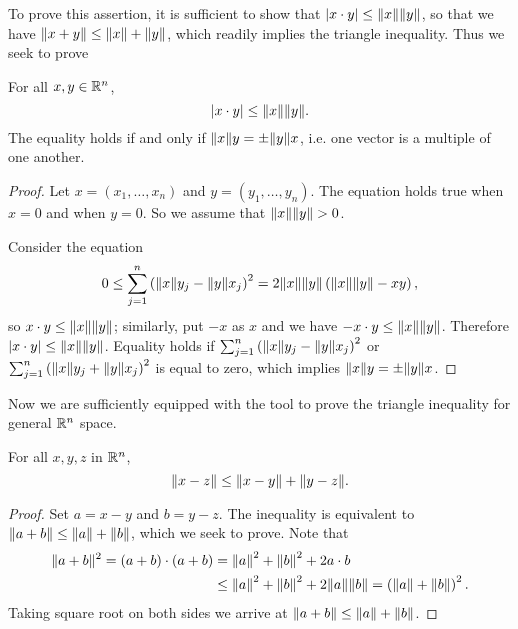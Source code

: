 \documentclass[main.tex]{subfiles}
\begin{document}
		To prove this assertion, it is sufficient to show that $\lvert x \cdot y\rvert \leq \lVert x\rVert \lVert y\rVert$, so that we have $\lVert x + y\rVert \leq \lVert x\rVert + \lVert y\rVert$, which readily implies the triangle inequality. Thus we seek to prove
		\begin{theorem}
			For all $x, y \in \mathbb R^n$,
			\begin{equation}
				\lvert x \cdot y\rvert \leq \lVert x\rVert \lVert y\rVert.
			\end{equation}
			The equality holds if and only if $\lVert x\rVert y = \pm \lVert y\rVert x$, i.e. one vector is a multiple of one another. 
		\end{theorem}
		\begin{proof}
			Let $x = (x_1, \ldots, x_n)$ and $y = (y_1, \ldots, y_n)$. The equation holds true when $x = 0$ and when $y = 0$. So we assume that $\lVert x\rVert \lVert y\rVert > 0$.
			
			Consider the equation
			\begin{equation*}
				0 \leq \sum_{j = 1}^n \left(\lVert x\rVert y_j - \lVert y\rVert x_j\right)^2 = 2\lVert x\rVert \lVert y\rVert \left(\lVert x\rVert \lVert y\rVert - xy\right),
			\end{equation*}
			so $x \cdot y \leq \lVert x\rVert \lVert y\rVert$; similarly, put $ - x $ as $x$ and we have $- x \cdot y \leq \lVert x\rVert\lVert y\rVert$. Therefore $\lvert x \cdot y\rvert \leq \lVert x\rVert \lVert y\rVert$. Equality holds if $\sum_{j = 1}^n \left(\lVert x\rVert y_j - \lVert y\rVert x_j\right)^2$ or $\sum_{j = 1}^n \left(\lVert x\rVert y_j + \lVert y\rVert x_j\right)^2$ is equal to zero, which implies $ \lVert x\rVert y = \pm \lVert y\rVert x$.
		\end{proof}
		Now we are sufficiently equipped with the tool to prove the triangle inequality for general $\mathbb R^n$ space.
		\begin{theorem}
			For all $x, y, z$ in $\mathbb R^n$,
			\begin{equation}
			\lVert x - z\rVert \leq \lVert x - y\rVert + \lVert y - z\rVert.
			\end{equation}
		\end{theorem}
		\begin{proof}
			Set $a = x - y$ and $b = y - z$. The inequality is equivalent to $\lVert a + b\rVert \leq \lVert a\rVert + \lVert b\rVert$, which we seek to prove. Note that
			\begin{align*}
				\lVert a + b\rVert^2 = \left(a + b\right)\cdot\left(a + b\right) & = {\lVert a\rVert}^2 + {\lVert b\rVert}^2 + 2 a \cdot b \\
				& \leq {\lVert a\rVert}^2 + {\lVert b\rVert}^2 + 2 \lVert a\rVert \lVert b\rVert = \left(\lVert a\rVert + \lVert b\rVert\right)^2.
			\end{align*}
			Taking square root on both sides we arrive at $\lVert a + b\rVert \leq \lVert a\rVert + \lVert b\rVert$.
		\end{proof}
	
\end{document}
